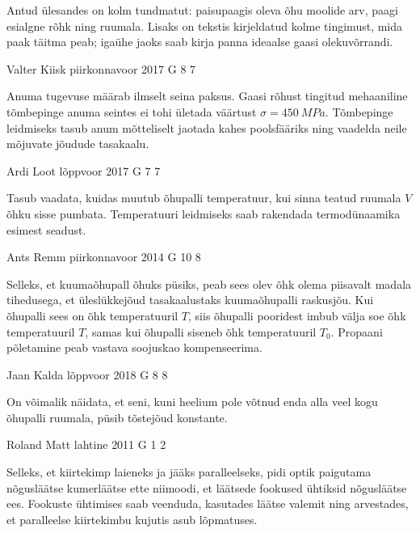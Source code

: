 \documentclass[11pt, twoside]{article}
\begin{document}
{{\ifHint
Antud ülesandes on kolm tundmatut: paisupaagis oleva õhu moolide arv, paagi esialgne rõhk ning ruumala. Lisaks on tekstis kirjeldatud kolme tingimust, mida paak täitma peab; igaühe jaoks saab kirja panna ideaalse gaasi olekuvõrrandi.
\fi
}

{Valter Kiisk} %
{piirkonnavoor} %
{2017} %
{G 8} %
{7} %
{

\ifHint
Anuma tugevuse määrab ilmselt seina paksus. Gaasi rõhust tingitud mehaaniline tõmbepinge anuma seintes ei tohi ületada väärtust $\sigma=\SI{450}{MPa}$. Tõmbepinge leidmiseks tasub anum mõtteliselt jaotada kahes poolsfääriks ning vaadelda neile mõjuvate jõudude tasakaalu.
\fi
}

{Ardi Loot} %
{lõppvoor} %
{2017} %
{G 7} %
{7} %
{

\ifHint
Tasub vaadata, kuidas muutub õhupalli temperatuur, kui sinna teatud ruumala $V$ õhku sisse pumbata. Temperatuuri leidmiseks saab rakendada termodünaamika esimest seadust.
\fi
}

{Ants Remm} %
{piirkonnavoor} %
{2014} %
{G 10} %
{8} %
{

\ifHint
Selleks, et kuumaõhupall õhuks püsiks, peab sees olev õhk olema piisavalt madala tihedusega, et üleslükkejõud tasakaalustaks kuumaõhupalli raskusjõu. Kui õhupalli sees on õhk temperatuuril $T$, siis õhupalli pooridest imbub välja soe õhk temperatuuril $T$, samas kui õhupalli siseneb õhk temperatuuril $T_0$. Propaani põletamine peab vastava soojuskao kompenseerima.
\fi
}

{Jaan Kalda} %
{lõppvoor} %
{2018} %
{G 8} %
{8} %
{

\ifHint
On võimalik näidata, et seni, kuni heelium pole võtnud enda alla veel kogu õhupalli ruumala, püsib tõstejõud konstante.
\fi
}

{Roland Matt} %
{lahtine} %
{2011} %
{G 1} %
{2} %
{

\ifHint
Selleks, et kiirtekimp laieneks ja jääks paralleelseks, pidi optik paigutama
nõgusläätse kumerläätse ette niimoodi, et läätsede fookused ühtiksid nõgusläätse
ees. Fookuste ühtimises saab veenduda, kasutades läätse valemit ning arvestades, et paralleelse kiirtekimbu kujutis asub lõpmatuses.
\fi
}

}
\end{document}
